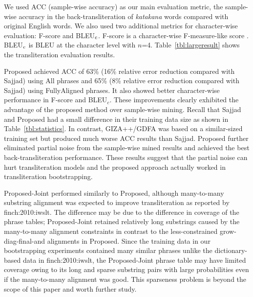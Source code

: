 \documentclass[english]{jnlp_1.4}
\newcommand{\newcite}{}
\begin{document}
We used ACC (sample-wise accuracy) as our main evaluation metric,
the sample-wise accuracy in the back-transliteration of {\it katakana} words compared with original English words.
We also used two additional metrics for character-wise evaluation:
F-score and BLEU$_{\rm c}$.
F-score is a character-wise F-measure-like score \cite{li:2010:news}.
BLEU$_{\rm c}$ is BLEU \cite{papineni:2002:acl} at the character level with $n$=4.
Table~{\ref{tbl:largeresult}} shows the transliteration evaluation results.

\begin{table}[b]
\label{tbl:largeresult}

\end{table}

{\sc Proposed} achieved ACC of 63\% (16\% relative error reduction compared with {\sc Sajjad}) using {\sc All} phrases
and 65\% (8\% relative error reduction compared with {\sc Sajjad}) using {\sc FullyAligned} phrases.
It also showed better character-wise performance in F-score and BLEU$_c$.
These improvements clearly exhibited the advantage of the proposed method over sample-wise mining.
Recall that {\sc Sajjad} and {\sc Proposed} had a small difference in their training data size
as shown in \mbox{Table~\ref{tbl:statistics}}.
In contrast, {\sc GIZA++/GDFA} was based on a similar-sized training set
but produced much worse ACC results than {\sc Sajjad}.
{\sc Proposed} further eliminated partial noise from the sample-wise mined results
and achieved the best back-transliteration performance.
These results suggest that the partial noise can hurt transliteration models
and the proposed approach actually worked in transliteration bootstrapping.

{\sc Proposed-Joint} performed similarly to {\sc Proposed},
although many-to-many substring alignment was expected to improve transliteration
as reported by \newcite{finch:2010:iwslt}.
The difference may be due to the difference in coverage of the phrase tables;
{\sc Proposed-Joint} retained relatively long substrings caused by the many-to-many alignment constraints
in contrast to the less-constrained grow-diag-final-and alignments in {\sc Proposed}.
Since the training data in our bootstrapping experiments contained many similar phrases
unlike the dictionary-based data in \newcite{finch:2010:iwslt},
the {\sc Proposed-Joint} phrase table may have limited coverage
owing to its long and sparse substring pairs with large probabilities even if the many-to-many alignment was good.
This sparseness problem is beyond the scope of this paper and worth further study.
\end{document}
